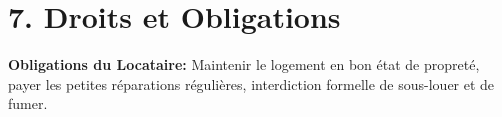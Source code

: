 \section*{7. Droits et Obligations}
\textbf{Obligations du Locataire:} Maintenir le logement en bon état de propreté, payer les petites réparations régulières, interdiction formelle de sous-louer et de fumer.

